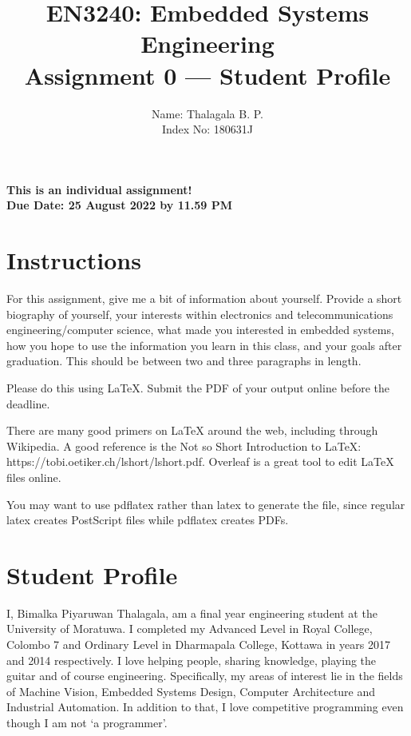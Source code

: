 \documentclass[11pt,letterpaper]{article}
\begin{document}
\title{EN3240: Embedded Systems Engineering \\Assignment 0 --- Student Profile}

\author{Name: Thalagala B. P. \\ Index No: 180631J}

\maketitle

\begin{center}
	\color{red}\bf This is an individual assignment! \\ Due Date: 25 August 2022 by 11.59 PM
\end{center}

\section*{Instructions}
%

For this assignment, give me a bit of information about yourself. Provide a short biography of yourself, your interests within electronics and telecommunications engineering/computer science, what made you interested in embedded systems, how you hope to use the information you learn in this class, and your goals after graduation. This should be between two and three paragraphs in length.

Please do this using LaTeX. Submit the PDF of your output online before the deadline.

There are many good primers on LaTeX around the web, including through Wikipedia. A good reference is the Not so Short Introduction to LaTeX: https://tobi.oetiker.ch/lshort/lshort.pdf. Overleaf is a great tool to edit LaTeX files online.

You may want to use pdflatex rather than latex to generate the file, since regular latex creates PostScript files while pdflatex creates PDFs.


\newpage
\section*{Student Profile}
I, Bimalka Piyaruwan Thalagala, am a final year engineering student at the University of Moratuwa. I completed my Advanced Level in Royal College, Colombo 7 and Ordinary Level in Dharmapala College, Kottawa in years 2017 and 2014 respectively. I love helping people, sharing knowledge, playing the guitar and of course engineering. Specifically, my areas of interest lie in the fields of Machine Vision, Embedded Systems Design, Computer Architecture and Industrial Automation. In addition to that, I love competitive programming even though I am not `a programmer'.\\
\end{document}
